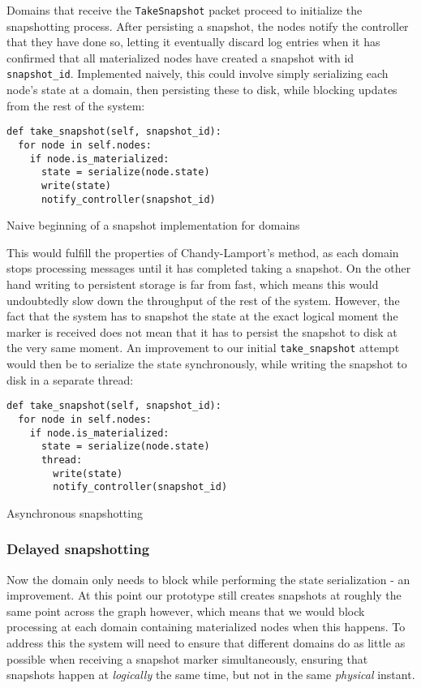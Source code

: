 \documentclass[b5paper]{report}
\begin{document}
Domains that receive the \texttt{TakeSnapshot} packet proceed to initialize the
snapshotting process. After persisting a snapshot, the nodes notify the
controller that they have done so, letting it eventually discard log entries
when it has confirmed that all materialized nodes have created a snapshot with
id \texttt{snapshot\_id}. Implemented naively, this could involve simply
serializing each node's state at a domain, then persisting these to disk, while
blocking updates from the rest of the system:

\begin{listing}[H]
  \begin{verbatim}
def take_snapshot(self, snapshot_id):
  for node in self.nodes:
    if node.is_materialized:
      state = serialize(node.state)
      write(state)
      notify_controller(snapshot_id)
  \end{verbatim}
  \caption{Naive beginning of a snapshot implementation for domains}
\end{listing}

This would fulfill the properties of Chandy-Lamport's method, as each domain
stops processing messages until it has completed taking a snapshot. On the other
hand writing to persistent storage is far from fast, which means this would
undoubtedly slow down the throughput of the rest of the system. However, the
fact that the system has to snapshot the state at the exact logical moment the
marker is received does not mean that it has to persist the snapshot to disk at
the very same moment. An improvement to our initial \texttt{take\_snapshot}
attempt would then be to serialize the state synchronously, while writing the
snapshot to disk in a separate thread:

\begin{listing}[H]
  \begin{verbatim}
def take_snapshot(self, snapshot_id):
  for node in self.nodes:
    if node.is_materialized:
      state = serialize(node.state)
      thread:
        write(state)
        notify_controller(snapshot_id)
  \end{verbatim}
  \caption{Asynchronous snapshotting}
\end{listing}

\subsubsection{Delayed snapshotting}
Now the domain only needs to block while performing the state serialization - an
improvement. At this point our prototype still creates snapshots at roughly the
same point across the graph however, which means that we would block processing
at each domain containing materialized nodes when this happens. To address this
the system will need to ensure that different domains do as little as possible
when receiving a snapshot marker simultaneously, ensuring that snapshots happen
at \textit{logically} the same time, but not in the same \textit{physical}
instant.
\end{document}
